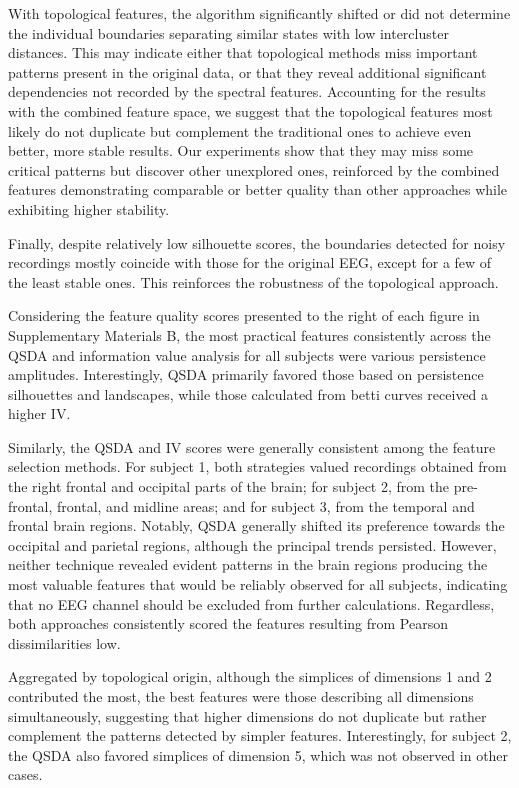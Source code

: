 \documentclass[10pt]{iopart}
\begin{document}
With topological features, the algorithm significantly shifted or did not determine the individual boundaries separating similar states with low intercluster distances. This may indicate either that topological methods miss important patterns present in the original data, or that they reveal additional significant dependencies not recorded by the spectral features. Accounting for the results with the combined feature space, we suggest that the topological features most likely do not duplicate but complement the traditional ones to achieve even better, more stable results. Our experiments show that they may miss some critical patterns but discover other unexplored ones, reinforced by the combined features demonstrating comparable or better quality than other approaches while exhibiting higher stability. 

Finally, despite relatively low silhouette scores, the boundaries detected for noisy recordings mostly coincide with those for the original EEG, except for a few of the least stable ones. This reinforces the robustness of the topological approach.

Considering the feature quality scores presented to the right of each figure in Supplementary Materials B, the most practical features consistently across the QSDA and information value analysis for all subjects were various persistence amplitudes. Interestingly, QSDA primarily favored those based on persistence silhouettes and landscapes, while those calculated from betti curves received a higher IV.\@

Similarly, the QSDA and IV scores were generally consistent among the feature selection methods. For subject 1, both strategies valued recordings obtained from the right frontal and occipital parts of the brain; for subject 2, from the pre-frontal, frontal, and midline areas; and for subject 3, from the temporal and frontal brain regions. Notably, QSDA generally shifted its preference towards the occipital and parietal regions, although the principal trends persisted. However, neither technique revealed evident patterns in the brain regions producing the most valuable features that would be reliably observed for all subjects, indicating that no EEG channel should be excluded from further calculations. Regardless, both approaches consistently scored the features resulting from Pearson dissimilarities low.

Aggregated by topological origin, although the simplices of dimensions 1 and 2 contributed the most, the best features were those describing all dimensions simultaneously, suggesting that higher dimensions do not duplicate but rather complement the patterns detected by simpler features. Interestingly, for subject 2, the QSDA also favored simplices of dimension 5, which was not observed in other cases.
\end{document}
